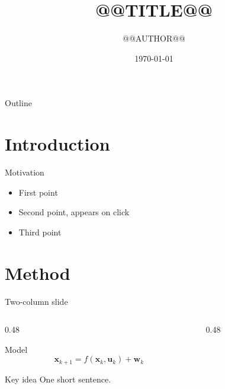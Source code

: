 \documentclass[aspectratio=169,11pt]{beamer}   %
\title[@@TITLE@@]{@@TITLE@@}
\subtitle{}
\author{@@AUTHOR@@}
\institute[@@AFFILIATION_SHORT@@]{@@AFFILIATION@@}
\date{\today}
\begin{document}
\begin{frame}
  \titlepage
\end{frame}

\begin{frame}{Outline}
  \tableofcontents
\end{frame}

\section{Introduction}

\begin{frame}{Motivation}
  \begin{itemize}
    \item First point
    \item<2-> Second point, appears on click
    \item<3-> Third point~\cite{lamport1994latex}
  \end{itemize}
\end{frame}

\section{Method}

\begin{frame}{Two-column slide}
  \begin{columns}[T]
    \begin{column}{0.48\textwidth}
      \begin{block}{Model}
        \[ \mathbf{x}_{k+1} = f(\mathbf{x}_k, \mathbf{u}_k) + \mathbf{w}_k \]
      \end{block}
      \begin{alertblock}{Key idea}
        One short sentence.
      \end{alertblock}
    \end{column}
    \begin{column}{0.48\textwidth}
      \centering
    \end{column}
  \end{columns}
\end{frame}

\end{document}
